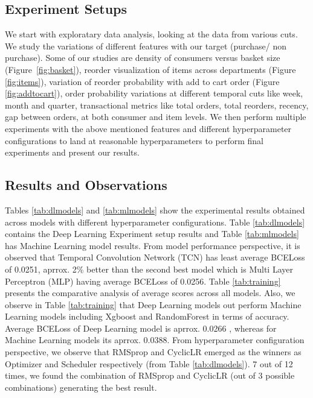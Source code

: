\subsection{Experiment Setups}
We start with exploratary data analysis, looking at the data from various cuts. We
study the variations of different features with our target (purchase/ non purchase). Some of our studies are
density of consumers versus basket size (Figure~\ref{fig:basket}), reorder visualization of items 
across departments (Figure \ref{fig:items}), variation of reorder probability with add to cart order (Figure \ref{fig:addtocart}),
order probability variations at different temporal cuts like week, month and quarter, transactional metrics 
like total orders, total reorders, recency, gap between orders, at both consumer and item levels.
We then perform multiple experiments with the above mentioned features and different hyperparameter configurations to land at reasonable 
hyperparameters to perform final experiments and present our results.

\subsection{Results and Observations}
Tables \ref{tab:dlmodels} and \ref{tab:mlmodels} show the experimental results obtained across models with different 
hyperparameter configurations. Table \ref{tab:dlmodels} contains the Deep Learning Experiment setup results
and Table \ref{tab:mlmodels} has Machine Learning model results. From model performance perspective, it is observed that 
Temporal Convolution Network (TCN) has least average BCELoss of 0.0251, aprrox. 2\% better than the second best model
which is Multi Layer Perceptron (MLP) having average BCELoss of 0.0256. Table \ref{tab:training} presents
the comparative analysis of average scores across all models. Also, we observe in Table \ref{tab:training} 
that Deep Learning models out perform Machine Learning models including Xgboost and RandomForest in terms of accuracy.
Average BCELoss of Deep Learning model is aprrox. 0.0266 , whereas for Machine Learning models its aprrox. 0.0388.
From hyperparameter configuration perspective, we observe that RMSprop and CyclicLR emerged as the 
winners as Optimizer and Scheduler respectively (from Table \ref{tab:dlmodels}). 7 out of 12 times, we 
found the combination of RMSprop and CyclicLR (out of 3 possible combinations) generating the best result.

